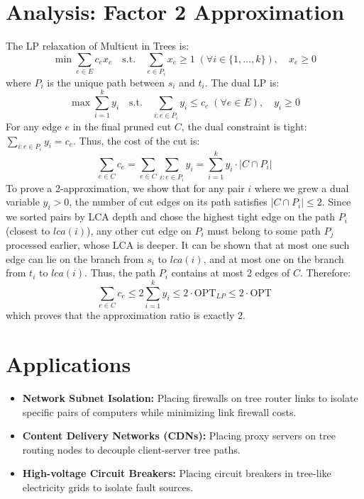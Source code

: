 \documentclass[11pt,oneside]{book}
\begin{document}
\section{Analysis: Factor 2 Approximation}
The LP relaxation of Multicut in Trees is:
\[
\min \sum_{e \in E} c_e x_e \quad \text{s.t.} \quad \sum_{e \in P_i} x_e \ge 1 \; (\forall i \in \{1, \dots, k\}), \quad x_e \ge 0
\]
where $P_i$ is the unique path between $s_i$ and $t_i$. The dual LP is:
\[
\max \sum_{i=1}^k y_i \quad \text{s.t.} \quad \sum_{i: e \in P_i} y_i \le c_e \; (\forall e \in E), \quad y_i \ge 0
\]
For any edge $e$ in the final pruned cut $C$, the dual constraint is tight: $\sum_{i: e \in P_i} y_i = c_e$. Thus, the cost of the cut is:
\[
\sum_{e \in C} c_e = \sum_{e \in C} \sum_{i: e \in P_i} y_i = \sum_{i=1}^k y_i \cdot |C \cap P_i|
\]
To prove a 2-approximation, we show that for any pair $i$ where we grew a dual variable $y_i > 0$, the number of cut edges on its path satisfies $|C \cap P_i| \le 2$.
Since we sorted pairs by LCA depth and chose the highest tight edge on the path $P_i$ (closest to $lca(i)$), any other cut edge on $P_i$ must belong to some path $P_j$ processed earlier, whose LCA is deeper. It can be shown that at most one such edge can lie on the branch from $s_i$ to $lca(i)$, and at most one on the branch from $t_i$ to $lca(i)$. Thus, the path $P_i$ contains at most 2 edges of $C$. Therefore:
\[
\sum_{e \in C} c_e \le 2 \sum_{i=1}^k y_i \le 2 \cdot \text{OPT}_{LP} \le 2 \cdot \text{OPT}
\]
which proves that the approximation ratio is exactly 2.

\section{Applications}
\begin{itemize}
    \item \textbf{Network Subnet Isolation:} Placing firewalls on tree router links to isolate specific pairs of computers while minimizing link firewall costs.
    \item \textbf{Content Delivery Networks (CDNs):} Placing proxy servers on tree routing nodes to decouple client-server tree paths.
    \item \textbf{High-voltage Circuit Breakers:} Placing circuit breakers in tree-like electricity grids to isolate fault sources.
\end{itemize}
\end{document}
